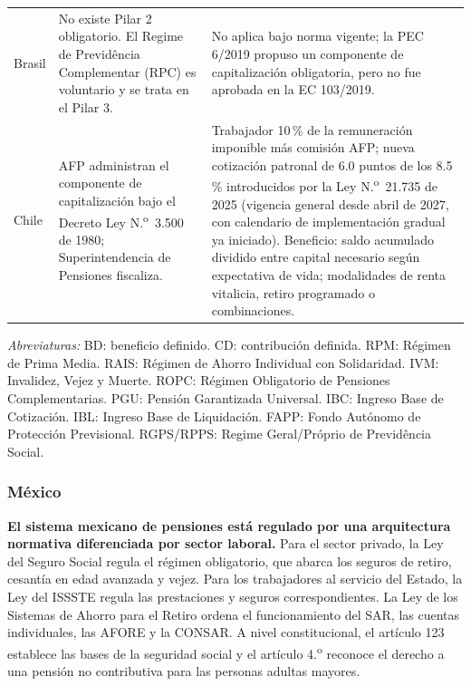 \documentclass[12pt, letterpaper]{article}
\begin{document}
\begin{xltabular}{\textwidth}{P{1.6cm}Y Y}
Brasil &
No existe Pilar 2 obligatorio. El Regime de Previdência Complementar (RPC) es voluntario y se trata en el Pilar 3. &
No aplica bajo norma vigente; la PEC 6/2019 propuso un componente de capitalización obligatoria, pero no fue aprobada en la EC 103/2019. \\

Chile &
AFP administran el componente de capitalización bajo el Decreto Ley N.\textsuperscript{o}~3.500 de 1980; Superintendencia de Pensiones fiscaliza. &
Trabajador 10\,\% de la remuneración imponible más comisión AFP; nueva cotización patronal de 6.0 puntos de los 8.5\,\% introducidos por la Ley N.\textsuperscript{o}~21.735 de 2025 (vigencia general desde abril de 2027, con calendario de implementación gradual ya iniciado). Beneficio: saldo acumulado dividido entre capital necesario según expectativa de vida; modalidades de renta vitalicia, retiro programado o combinaciones. \\

\end{xltabular}

\begin{small}
\noindent\textit{Abreviaturas:} BD: beneficio definido. CD: contribución definida. RPM: Régimen de Prima Media. RAIS: Régimen de Ahorro Individual con Solidaridad. IVM: Invalidez, Vejez y Muerte. ROPC: Régimen Obligatorio de Pensiones Complementarias. PGU: Pensión Garantizada Universal. IBC: Ingreso Base de Cotización. IBL: Ingreso Base de Liquidación. FAPP: Fondo Autónomo de Protección Previsional. RGPS/RPPS: Regime Geral/Próprio de Previdência Social.
\end{small}

\subsubsection{México}

\textbf{El sistema mexicano de pensiones está regulado por una arquitectura normativa diferenciada por sector laboral.} Para el sector privado, la Ley del Seguro Social regula el régimen obligatorio, que abarca los seguros de retiro, cesantía en edad avanzada y vejez. Para los trabajadores al servicio del Estado, la Ley del ISSSTE regula las prestaciones y seguros correspondientes. La Ley de los Sistemas de Ahorro para el Retiro ordena el funcionamiento del SAR, las cuentas individuales, las AFORE y la CONSAR. A nivel constitucional, el artículo 123 establece las bases de la seguridad social y el artículo 4.\textsuperscript{o} reconoce el derecho a una pensión no contributiva para las personas adultas mayores.
\end{document}
